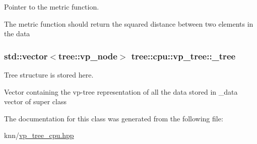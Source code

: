 Pointer to the metric function. 

The metric function should return the squared distance between two elements in the data \hypertarget{classtree_1_1cpu_1_1vp__tree_ac5173f60c5365b1b878001822a6aa194}{}
\subsubsection[{\+\_\+tree}]{\setlength{\rightskip}{0pt plus 5cm}std\+::vector$<${\bf tree\+::vp\+\_\+node}$>$ tree\+::cpu\+::vp\+\_\+tree\+::\+\_\+tree\hspace{0.3cm}{\ttfamily [protected]}}\label{classtree_1_1cpu_1_1vp__tree_ac5173f60c5365b1b878001822a6aa194}


Tree structure is stored here. 

Vector containing the vp-\/tree representation of all the data stored in \+\_\+data vector of super class 

The documentation for this class was generated from the following file\+:\begin{DoxyCompactItemize}
\item 
knn/\hyperlink{vp__tree__cpu_8hpp}{vp\+\_\+tree\+\_\+cpu.\+hpp}\end{DoxyCompactItemize}

